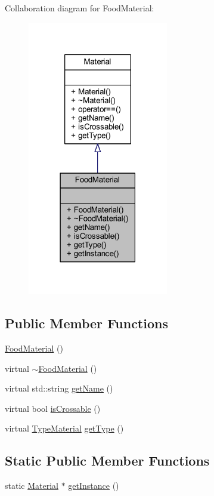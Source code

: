 Collaboration diagram for Food\+Material\+:\nopagebreak
\begin{figure}[H]
\begin{center}
\leavevmode
\includegraphics[width=174pt]{class_food_material__coll__graph}
\end{center}
\end{figure}
\subsection*{Public Member Functions}
\begin{DoxyCompactItemize}
\item 
\hyperlink{class_food_material_a2b0c303d7f787f6fee018bf64b6fdd75}{Food\+Material} ()
\item 
virtual \hyperlink{class_food_material_abdf8622caeb1e702c638ecfb3da57f59}{$\sim$\+Food\+Material} ()
\item 
virtual std\+::string \hyperlink{class_food_material_a778bd246058cf83fa5511f5bbf65816f}{get\+Name} ()
\item 
virtual bool \hyperlink{class_food_material_a90e7c802995a85b66f22aa29a7da7a9f}{is\+Crossable} ()
\item 
virtual \hyperlink{_material_8hpp_af43d43a4fff6221e289f8d3db9904ec0}{Type\+Material} \hyperlink{class_food_material_a38e6addc02a2e8df5fc26eeef6d5126c}{get\+Type} ()
\end{DoxyCompactItemize}
\subsection*{Static Public Member Functions}
\begin{DoxyCompactItemize}
\item 
static \hyperlink{class_material}{Material} $\ast$ \hyperlink{class_food_material_a5056a2f17ae3a2ab8b4704870d615c6e}{get\+Instance} ()
\end{DoxyCompactItemize}


